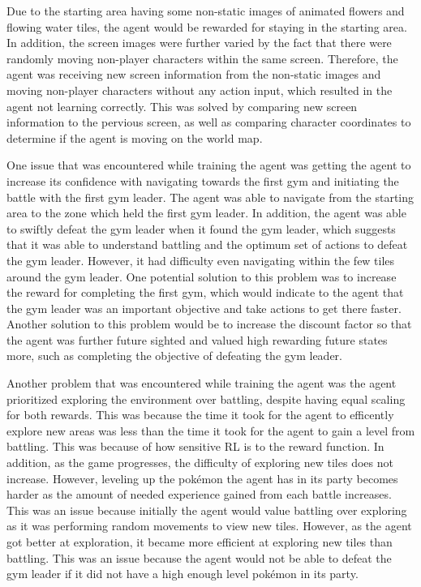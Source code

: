 Due to the starting area having some non-static images of animated flowers and flowing water tiles, the agent would be rewarded for staying in the starting area. In addition, the screen images were further varied by the fact that there were randomly moving non-player characters within the same screen. Therefore, the agent was receiving new screen information from the non-static images and moving non-player characters without any action input, which resulted in the agent not learning correctly. This was solved by comparing new screen information to the pervious screen, as well as comparing character coordinates to determine if the agent is moving on the world map. 

One issue that was encountered while training the agent was getting the agent to increase its confidence with navigating towards the first gym and initiating the battle with the first gym leader. The agent was able to navigate from the starting area to the zone which held the first gym leader. In addition, the agent was able to swiftly defeat the gym leader when it found the gym leader, which suggests that it was able to understand battling and the optimum set of actions to defeat the gym leader. However, it had difficulty even navigating within the few tiles around the gym leader. One potential solution to this problem was to increase the reward for completing the first gym, which would indicate to the agent that the gym leader was an important objective and take actions to get there faster. Another solution to this problem would be to increase the discount factor so that the agent was further future sighted and valued high rewarding future states more, such as completing the objective of defeating the gym leader. 

Another problem that was encountered while training the agent was the agent prioritized exploring the environment over battling, despite having equal scaling for both rewards. This was because the time it took for the agent to efficently explore new areas was less than the time it took for the agent to gain a level from battling. This was because of how sensitive RL is to the reward function. In addition, as the game progresses, the difficulty of exploring new tiles does not increase. However, leveling up the pokémon the agent has in its party becomes harder as the amount of needed experience gained from each battle increases. This was an issue because initially the agent would value battling over exploring as it was performing random movements to view new tiles. However, as the agent got better at exploration, it became more efficient at exploring new tiles than battling. This was an issue because the agent would not be able to defeat the gym leader if it did not have a high enough level pokémon in its party. 

